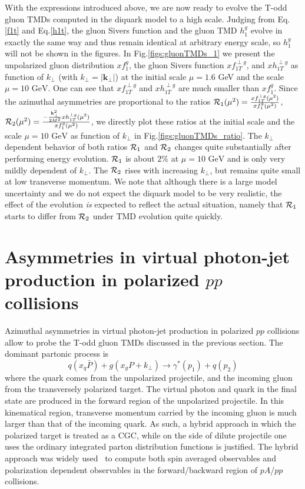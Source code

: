 \documentclass[prd,aps,preprintnumbers,fleqn,showpacs,nofootinbib,superscriptaddress]{revtex4}
\begin{document}
With the expressions introduced above, we are now ready to evolve the T-odd gluon TMDs computed in the diquark model  to a high scale. Judging from Eq.\ref{f1t}
and Eq.\ref{h1t}, the gluon Sivers function and the gluon TMD $h_{1}^{g}$ evolve in exactly the same way and thus remain identical at arbitrary energy scale, so $h_1^g$ will not be shown in the figures.
In Fig.\ref{figs:gluonTMDs_1} we present  the unpolarized gluon distribution $x f_1^g$,
 the gluon Sivers function $x f_{1T}^{\perp g}$,  and $x h_{1T}^{\perp g}$ as  function
 of $k_\perp$ (with $k_\perp = |\bm{k}_\perp|$) at the initial scale $\mu=1.6$ GeV and the scale  $\mu=\text{10 GeV}$.
 One can see that $x f_{1T}^{\perp g}$ and $x h_{1T}^{\perp g}$ are much smaller than $x f_1^g$. Since the azimuthal asymmetries are proportional to the ratios ${\cal R}_1(\mu^2)=\frac{x f_{1T}^{\perp g}(\mu^2)}{x f_{1}^{g}(\mu^2)}$, ${\cal R}_2(\mu^2) = \frac{-\frac{\bold{k}_\perp^2}{2 M^2} x h_{1T}^{\perp g}(\mu^2)}{x f_{1}^{g}(\mu^2)}$, we  directly plot these   ratios at the initial scale and the scale $\mu=\text{10 GeV}$ as  function of  $k_\perp$ in Fig.\ref{figs:gluonTMDs_ratio}. The $k_\perp$ dependent behavior of both ratios ${\cal R}_1$ and ${\cal R}_2$ changes quite substantially after performing energy evolution. ${\cal R}_1$ is about $2\%$ at $\mu=\text{10 GeV}$ and is only very mildly  dependent of $k_\perp$. The  ${\cal R}_2$ rises with increasing  $k_\perp$, but remains quite small at low transverse momentum.
We note that although there is a large model uncertainty and we do not expect the diquark model to be very realistic, the effect of the evolution {\it is} expected to reflect the actual situation, namely that ${\cal R}_1$ starts to differ from  ${\cal R}_2$ under TMD evolution quite quickly.

\section{Asymmetries in virtual photon-jet production in polarized $pp$ collisions}
Azimuthal asymmetries in virtual photon-jet production in polarized $pp$ collisions allow to
probe the T-odd gluon TMDs discussed in the previous section. The dominant partonic process is
\begin{equation}
 q(x_q \bar P) + g(x_gP+k_{\perp})  \to \gamma^*(p_1)+q(p_2)
\end{equation}
where the quark comes from the unpolarized projectile,
 and the incoming gluon  from the transversely polarized target.
 The virtual photon and quark in the final state are produced in the forward region of the unpolarized
 projectile. In this kinematical region, transverse momentum carried by the incoming gluon is much larger than
 that of the incoming quark. As such, a hybrid approach in which the polarized target is treated as a CGC, while
 on the side of dilute projectile one uses the ordinary integrated parton distribution functions is justified.
 The hybrid approach was widely used~\cite{Gelis:2002ki} to compute both spin averaged observables  and polarization dependent observables in the forward/backward region of $pA$/$pp$ collisions.
\end{document}
